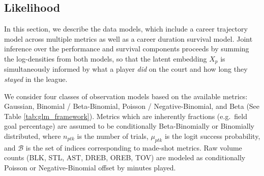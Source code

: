 \documentclass[aoas]{imsart}
\begin{document}













\subsection{Likelihood}
\label{sec:likelihoods}
In this section, we describe the data models, which include a career trajectory model across multiple metrics as well as a career duration survival model. Joint inference over the performance and survival components proceeds by summing the log-densities from both models, so that the latent embedding $X_p$ is simultaneously informed by what a player \emph{did} on the court and how long they \emph{stayed} in the league.

We consider four classes of observation models based on the available metrics: Gaussian, Binomial / Beta-Binomial, Poisson /  Negative-Binomial, and Beta (See Table \ref{tab:glm_framework}). Metrics which are inherently fractions (e.g.\ field goal percentage) are assumed to be conditionally Beta-Binomially or Binomially distributed, where $n_{ptk}$ is the number of trials, $\mu_{ptk}$ is the logit success probability, and $\mathcal{B}$ is the set of indices corresponding to made-shot metrics.  Raw volume counts (BLK, STL, AST, DREB, OREB, TOV) are modeled as conditionally Poisson or Negative-Binomial offset by minutes played.
\end{document}
